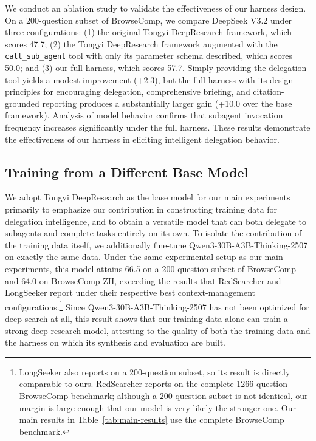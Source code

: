 \documentclass{llmxive}
\begin{document}
We conduct an ablation study to validate the effectiveness of our harness design. On a 200-question subset of BrowseComp, we compare DeepSeek V3.2 under three configurations: (1) the original Tongyi DeepResearch framework, which scores 47.7; (2) the Tongyi DeepResearch framework augmented with the \texttt{call\_sub\_agent} tool with only its parameter schema described, which scores 50.0; and (3) our full harness, which scores 57.7. Simply providing the delegation tool yields a modest improvement (+2.3), but the full harness with its design principles for encouraging delegation, comprehensive briefing, and citation-grounded reporting produces a substantially larger gain (+10.0 over the base framework). Analysis of model behavior confirms that subagent invocation frequency increases significantly under the full harness. These results demonstrate the effectiveness of our harness in eliciting intelligent delegation behavior.

\subsection{Training from a Different Base Model}

We adopt Tongyi DeepResearch as the base model for our main experiments primarily to emphasize our contribution in constructing training data for delegation intelligence, and to obtain a versatile model that can both delegate to subagents and complete tasks entirely on its own. To isolate the contribution of the training data itself, we additionally fine-tune Qwen3-30B-A3B-Thinking-2507 on exactly the same data. Under the same experimental setup as our main experiments, this model attains 66.5 on a 200-question subset of BrowseComp and 64.0 on BrowseComp-ZH, exceeding the results that RedSearcher and LongSeeker report under their respective best context-management configurations.\footnote{LongSeeker also reports on a 200-question subset, so its result is directly comparable to ours. RedSearcher reports on the complete 1266-question BrowseComp benchmark; although a 200-question subset is not identical, our margin is large enough that our model is very likely the stronger one. Our main results in Table~\ref{tab:main-results} use the complete BrowseComp benchmark.} Since Qwen3-30B-A3B-Thinking-2507 has not been optimized for deep search at all, this result shows that our training data alone can train a strong deep-research model, attesting to the quality of both the training data and the harness on which its synthesis and evaluation are built.
\end{document}
